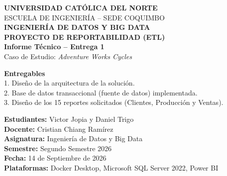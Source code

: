 \documentclass[11pt,letterpaper]{article}
\begin{document}
\begin{titlepage}
    \centering
    \vspace*{-1cm}
    {\large \textbf{UNIVERSIDAD CATÓLICA DEL NORTE}}\\[0.2cm]
    {\normalsize ESCUELA DE INGENIERÍA -- SEDE COQUIMBO}\\[2.5cm]

    {\LARGE \bfseries \color{ucnblue} INGENIERÍA DE DATOS Y BIG DATA}\\[0.5cm]
    {\Large \bfseries \color{darknavy} PROYECTO DE REPORTABILIDAD (ETL)}\\[0.3cm]
    {\large \textbf{Informe Técnico -- Entrega 1}}\\[0.2cm]
    {\normalsize Caso de Estudio: \textit{Adventure Works Cycles}}\\[2.0cm]

    \begin{tcolorbox}[colback=lightgraybg, colframe=ucnblue, width=0.9\textwidth, arc=2mm, boxrule=1pt]
        \centering
        \textbf{Entregables}\\[0.15cm]
        \small
        1. Diseño de la arquitectura de la solución.\\
        2. Base de datos transaccional (fuente de datos) implementada.\\
        3. Diseño de los 15 reportes solicitados (Clientes, Producción y Ventas).
    \end{tcolorbox}

    \vfill

    \begin{flushleft}
        \textbf{Estudiantes:} Victor Jopia y Daniel Trigo\\
        \textbf{Docente:} Cristian Chiang Ramírez\\
        \textbf{Asignatura:} Ingeniería de Datos y Big Data\\
        \textbf{Semestre:} Segundo Semestre 2026\\
        \textbf{Fecha:} 14 de Septiembre de 2026\\
        \textbf{Plataformas:} Docker Desktop, Microsoft SQL Server 2022, Power BI
    \end{flushleft}
\end{titlepage}

\end{document}

